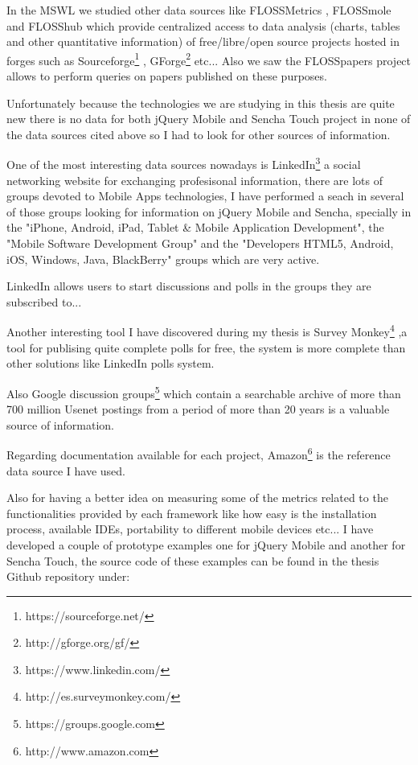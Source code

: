 \documentclass[a4paper,12pt]{book}
\begin{document}
In the MSWL we studied other data sources like FLOSSMetrics\cite{FLOSSMetrics} , FLOSSmole\cite{FLOSSmole} and FLOSShub\cite{FLOSShub} which provide centralized access to data analysis (charts, tables and other quantitative information) of free/libre/open source projects hosted in forges such as Sourceforge\footnote{https://sourceforge.net/} , GForge\footnote{http://gforge.org/gf/}  etc... Also we saw the FLOSSpapers project\cite{FLOSSpapers} allows to perform queries on papers published on these purposes.

Unfortunately because the technologies we are studying in this thesis are quite new there is no data for both jQuery Mobile and Sencha Touch project in none of the data sources cited above so I had to look for other sources of information.

One of the most interesting data sources nowadays is LinkedIn\footnote{https://www.linkedin.com/}  a social networking website for exchanging profesisonal information, there are lots of groups devoted to Mobile Apps technologies, I have performed a seach in several of those groups looking for information on jQuery Mobile and Sencha, specially in the "iPhone, Android, iPad, Tablet \& Mobile Application Development"\cite{linkedin1},  the "Mobile Software Development Group"\cite{linkedin2} and the "Developers HTML5, Android, iOS, Windows, Java, BlackBerry"\cite{linkedin3} groups which are very active. 

LinkedIn allows users to start discussions and polls in the groups they are subscribed to... 

Another interesting tool I have discovered during my thesis is Survey Monkey\footnote{http://es.surveymonkey.com/} ,a tool for publising quite complete polls for free, the system is more complete than other solutions like LinkedIn polls system.


Also Google discussion groups\footnote{https://groups.google.com} which contain a searchable archive of more than 700 million Usenet postings from a period of more than 20 years is a valuable source of information.

Regarding documentation available for each project, Amazon\footnote{http://www.amazon.com} is the reference data source I have used.

Also for having a better idea on measuring some of the metrics related to the functionalities provided by each framework like how easy is the installation process, available IDEs, portability to different mobile devices etc... I have developed a couple of prototype examples one for jQuery Mobile and another for Sencha Touch, the source code of these examples can be found in the thesis Github repository under:\\
\end{document}
